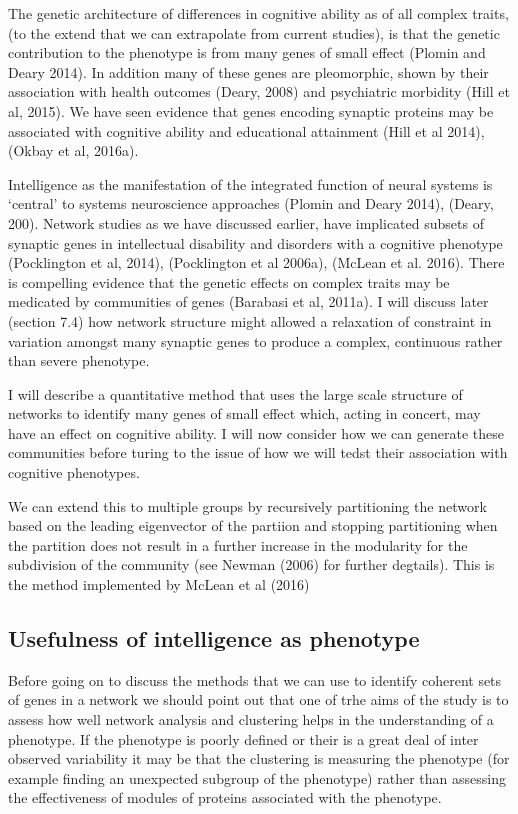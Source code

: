 The genetic architecture of differences in cognitive ability as of all complex traits, (to the extend that we can extrapolate from current studies), is that the genetic contribution to the phenotype is from many genes of small effect (Plomin and Deary 2014). In addition many of these genes are pleomorphic, shown by their association with health outcomes (Deary, 2008) and psychiatric morbidity (Hill et al, 2015). We have seen evidence that genes encoding synaptic proteins may be associated with cognitive ability and educational attainment (Hill et al 2014), (Okbay et al, 2016a).

Intelligence as the manifestation of the integrated function of neural systems is ‘central’ to systems neuroscience approaches (Plomin and Deary 2014), (Deary, 200). Network studies as we have discussed earlier, have implicated subsets of synaptic genes in intellectual disability and disorders with a cognitive phenotype (Pocklington et al, 2014), (Pocklington et al 2006a), (McLean et al. 2016). There is compelling evidence that the genetic effects on complex traits may be medicated by communities of genes (Barabasi et al, 2011a). I will discuss later (section 7.4) how network structure might allowed a relaxation of constraint in variation amongst many synaptic genes to produce a complex, continuous rather than severe phenotype.

I will describe a quantitative method that uses the large scale structure of networks to identify many genes of small effect which, acting in concert, may have an effect on cognitive ability. I will now consider how we can generate these communities before turing to the issue of how we will tedst their association with cognitive phenotypes.


We can extend this to multiple groups by recursively partitioning the network based on the leading eigenvector of the partiion and stopping partitioning when the partition does not result in a further increase in the modularity for the subdivision of the community (see Newman (2006) for further degtails). This is the method implemented by McLean et al (2016)

\subsection{Usefulness of intelligence as phenotype}

Before going on to discuss the methods that we can use to identify coherent sets of genes in a network we should point out that one of trhe aims of the study is to assess how well network analysis and clustering helps in the understanding of a phenotype. If the phenotype is poorly defined or their is a great deal of inter observed variability it may be that the clustering is measuring the phenotype (for example finding an unexpected subgroup of the phenotype) rather than assessing the effectiveness of modules of proteins associated with the phenotype.

